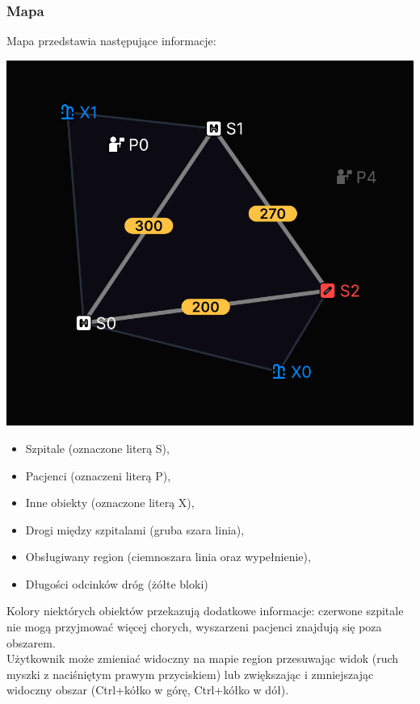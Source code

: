 \documentclass{article}
\begin{document}
\pagebreak
\subsubsection{Mapa}
Mapa przedstawia następujące informacje: \\

\centerline{\includegraphics[scale=0.3]{images/map.png}}
 \vspace{0.7cm}
 
\begin{itemize}
    \item Szpitale (oznaczone literą S),
    \item Pacjenci (oznaczeni literą P),
    \item Inne obiekty (oznaczone literą X),
    \item Drogi między szpitalami (gruba szara linia),
    \item Obsługiwany region (ciemnoszara linia oraz wypełnienie),
    \item Długości odcinków dróg (żółte bloki)
\end{itemize}

Kolory niektórych obiektów przekazują dodatkowe informacje: czerwone szpitale nie mogą przyjmować więcej chorych, wyszarzeni pacjenci znajdują się poza obszarem. \\
Użytkownik może zmieniać widoczny na mapie region przesuwając widok (ruch myszki z naciśniętym prawym przyciskiem) lub zwiększając i zmniejszając widoczny obszar (Ctrl+kółko w górę, Ctrl+kółko w dół).
\end{document}
